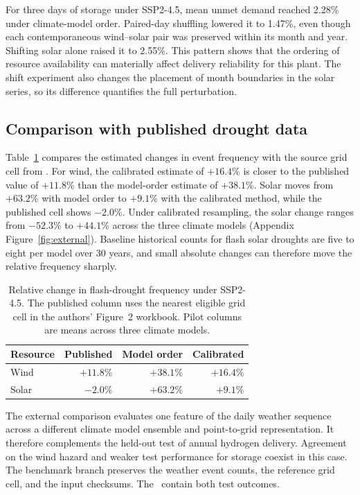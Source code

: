 For three days of storage under SSP2-4.5, mean unmet demand reached 2.28\% under climate-model order. Paired-day shuffling lowered it to 1.47\%, even though each contemporaneous wind--solar pair was preserved within its month and year. Shifting solar alone raised it to 2.55\%. This pattern shows that the ordering of resource availability can materially affect delivery reliability for this plant. The shift experiment also changes the placement of month boundaries in the solar series, so its difference quantifies the full perturbation.

\subsection{Comparison with published drought data}
Table~\ref{tab:literature} compares the estimated changes in event frequency with the source grid cell from \citet{lin2026}. For wind, the calibrated estimate of $+16.4$\% is closer to the published value of $+11.8$\% than the model-order estimate of $+38.1$\%. Solar moves from $+63.2$\% with model order to $+9.1$\% with the calibrated method, while the published cell shows $-2.0$\%. Under calibrated resampling, the solar change ranges from $-52.3$\% to $+44.1$\% across the three climate models (Appendix Figure~\ref{fig:external}). Baseline historical counts for flash solar droughts are five to eight per model over 30 years, and small absolute changes can therefore move the relative frequency sharply.

\begin{table}[t]
\centering\small
\caption{Relative change in flash-drought frequency under SSP2-4.5. The published column uses the nearest eligible grid cell in the authors' Figure~2 workbook. Pilot columns are means across three climate models.}
\label{tab:literature}
\begin{tabular}{@{}lrrr@{}}
\toprule
Resource & Published & Model order & Calibrated \\
\midrule
Wind  & $+11.8$\% & $+38.1$\% & $+16.4$\% \\
Solar & $-2.0$\%  & $+63.2$\% & $+9.1$\% \\
\bottomrule
\end{tabular}
\end{table}

The external comparison evaluates one feature of the daily weather sequence across a different climate model ensemble and point-to-grid representation. It therefore complements the held-out test of annual hydrogen delivery. Agreement on the wind hazard and weaker test performance for storage coexist in this case. The benchmark branch preserves the weather event counts, the reference grid cell, and the input checksums. The \RepoBenchmarks\ contain both test outcomes.
